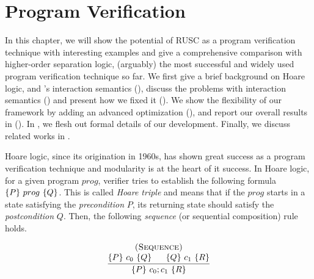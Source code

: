 \chapter{\;\;\;\;Program Verification}
\label{sec:program}

In this chapter, we will show the potential of RUSC as a program verification technique with interesting examples and give a comprehensive comparison with higher-order separation logic, (arguably) the most successful and widely used program verification technique so far.
We first give a brief background on Hoare logic,
\cc{} and \ccc{}'s interaction semantics (), discuss the problems with interaction semantics () and present how we fixed it ().
We show the flexibility of our framework by adding an advanced optimization (), and report our overall results in ().
In , we flesh out formal details of our development.
Finally, we discuss related works in .








Hoare logic, since its origination in 1960s, has shown great success as a program verification technique and modularity is at the heart of it success.
In Hoare logic, for a given program $prog$, verifier tries to establish the following formula $\{{P}\}~{prog}~\{{Q}\}$.
This is called {\it Hoare triple} and means that if the $prog$ starts in a state satisfying the {\it precondition} $P$,
its returning state should satisfy the {\it postcondition} $Q$.
Then, the following {\it sequence} (or sequential composition) rule holds.

\[
\infer
    {\hoare{P}{c_{0} ; c_{1}}{R}}
    {\deduce{\hoare{P}{c_{0}}{Q} \;\;\;\;\;\; \hoare{Q}{c_{1}}{R}}
      {\textsc{(Sequence)}}}
\]

